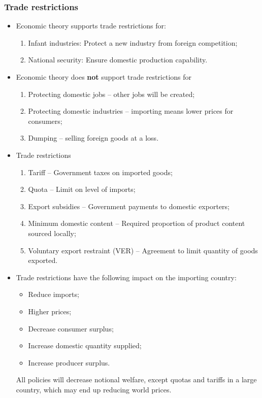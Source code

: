 \documentclass[../notes_compiled.tex]{subfiles}
\begin{document}
\subsubsection{Trade restrictions}
\begin{itemize}
\item Economic theory supports trade restrictions for:
\begin{enumerate}
\item Infant industries: Protect a new industry from foreign competition;
\item National security: Ensure domestic production capability.
\end{enumerate}
\item Economic theory does \textbf{not} support trade restrictions for
\begin{enumerate}
\item Protecting domestic jobs -- other jobs will be created;
\item Protecting domestic industries -- importing means lower prices for consumers;
\item Dumping -- selling foreign goods at a loss.
\end{enumerate}
\item Trade restrictions
\begin{enumerate}
\item Tariff -- Government taxes on imported goods;
\item Quota -- Limit on level of imports;
\item Export subsidies -- Government payments to domestic exporters;
\item Minimum domestic content -- Required proportion of product content sourced locally;
\item Voluntary export restraint (VER) -- Agreement to limit quantity of goods exported.
\end{enumerate}
\item Trade restrictions have the following impact on the importing country:
\begin{itemize}
\item Reduce imports;
\item Higher prices;
\item Decrease consumer surplus;
\item Increase domestic quantity supplied;
\item Increase producer surplus.
\end{itemize}
All policies will decrease notional welfare, except quotas and tariffs in  a large country, which may end up reducing world prices.

\end{itemize}
\end{document}
